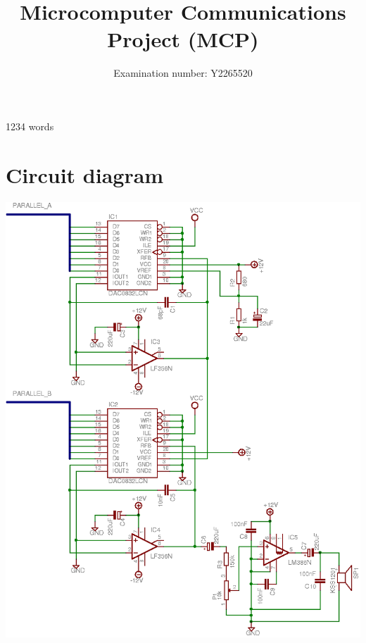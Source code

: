 \documentclass[10pt]{article}
\title{Microcomputer Communications Project (MCP)}
\author{Examination number: Y2265520}
\newif\ifnotwc\notwctrue
\begin{document}
\ifnotwc

\maketitle
\begin{center}
1234 words
\end{center}
\newpage
\tableofcontents

\fi %








\ifnotwc

\appendix

\section{Circuit diagram}
\begin{center}
\label{appendix:circuit_diagram}
\includegraphics[totalheight=0.92\textheight]{images/output-schematic.png}
\end{center}

\pagebreak
\begin{thebibliography}{99}
\end{thebibliography}

\fi %
\end{document}
